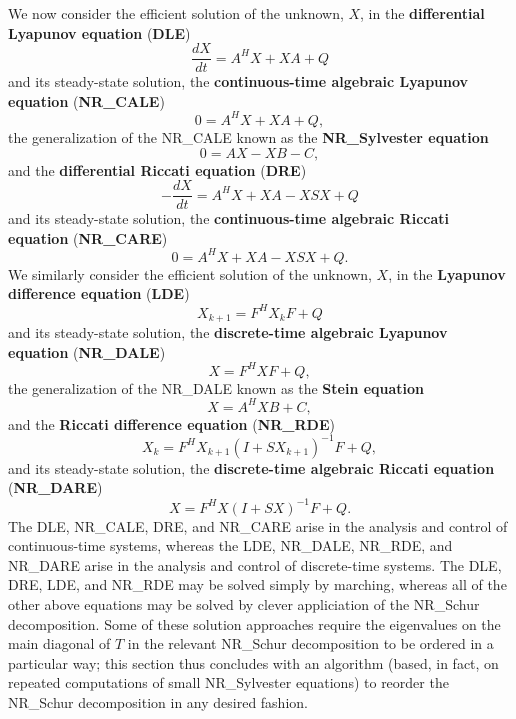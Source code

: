 We now consider the efficient solution of the unknown, $X$, in the {\bf differential Lyapunov equation} ({\bf DLE})
\begin{equation*}
\frac{dX}{dt} = A^H X + X A + Q
\end{equation*}
and its steady-state solution, the {\bf continuous-time algebraic Lyapunov equation} ({\bf NR_CALE})
\begin{equation*}
0 = A^H X + X A + Q,
\end{equation*}
the generalization of the NR_CALE known as the {\bf NR_Sylvester equation}
\begin{equation*}
0= A X - X B - C,
\end{equation*}
and the {\bf differential Riccati equation} ({\bf DRE})
\begin{equation*}
- \frac{d X}{dt} = A^H X + X A - X S X + Q
\end{equation*}
and its steady-state solution, the {\bf continuous-time algebraic Riccati equation} ({\bf NR_CARE})
\begin{equation*}
0 = A^H X + X A - X S X + Q.
\end{equation*}
We similarly consider the efficient solution of the unknown, $X$, in the {\bf Lyapunov difference equation} ({\bf LDE})
\begin{equation*}
X_{k+1} = F^H X_k F + Q
\end{equation*}
and its steady-state solution, the {\bf discrete-time algebraic Lyapunov equation} ({\bf NR_DALE})
\begin{equation*}
X = F^H X F + Q,
\end{equation*}
the generalization of the NR_DALE known as the {\bf Stein equation}
\begin{equation*}
X = A^H X B + C,
\end{equation*}
and the {\bf Riccati difference equation} ({\bf NR_RDE})
\begin{equation*}
  X_k = F^H X_{k+1} (I+ S X_{k+1})^{-1} F + Q, 
\end{equation*}
and its steady-state solution, the {\bf discrete-time algebraic Riccati equation} ({\bf NR_DARE})
\begin{equation*}
X = F^H X (I+ S X)^{-1} F + Q.
\end{equation*}
The DLE, NR_CALE, DRE, and NR_CARE arise in the analysis and control of continuous-time systems, whereas
the LDE, NR_DALE, NR_RDE, and NR_DARE arise in the analysis and control of discrete-time systems.
The DLE, DRE, LDE, and NR_RDE may be solved simply by marching, whereas all of the other above equations may be solved by clever appliciation
of the NR_Schur decomposition. Some of these solution approaches require the eigenvalues on the main diagonal of $T$ in
the relevant NR_Schur decomposition to be ordered in a particular way; this section thus concludes with an algorithm (based, in fact, on
repeated computations of small NR_Sylvester equations) to reorder the NR_Schur decomposition in any desired fashion.

